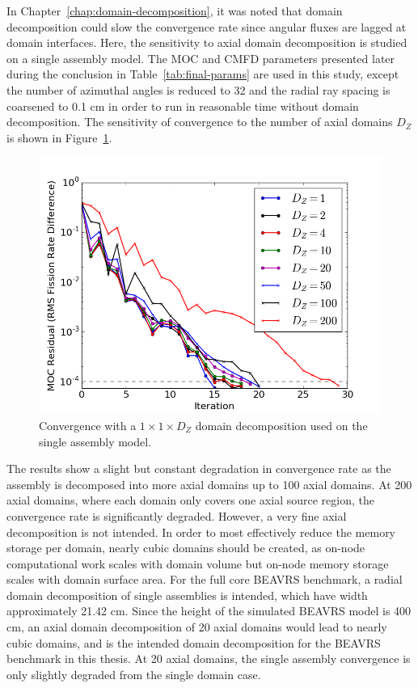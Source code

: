 In Chapter~\ref{chap:domain-decomposition}, it was noted that domain decomposition could slow the convergence rate since angular fluxes are lagged at domain interfaces. Here, the sensitivity to axial domain decomposition is studied on a single assembly model. The \ac{MOC} and \ac{CMFD} parameters presented later during the conclusion in Table~\ref{tab:final-params} are used in this study, except the number of azimuthal angles is reduced to 32 and the radial ray spacing is coarsened to 0.1 cm in order to run in reasonable time without domain decomposition. The sensitivity of convergence to the number of axial domains $D_Z$ is shown in Figure~\ref{fig:axial-dd}.

\begin{figure}[h!]
	\centering
	\includegraphics[width=0.9\linewidth]{figures/results/sensitivity/domains_z.png}
	\caption[]{Convergence with a $1 \times 1 \times D_Z$ domain decomposition used on the single assembly model.}
	\label{fig:axial-dd}
\end{figure}

The results show a slight but constant degradation in convergence rate as the assembly is decomposed into more axial domains up to 100 axial domains. At 200 axial domains, where each domain only covers one axial source region, the convergence rate is significantly degraded. However, a very fine axial decomposition is not intended. In order to most effectively reduce the memory storage per domain, nearly cubic domains should be created, as on-node computational work scales with domain volume but on-node memory storage scales with domain surface area. For the full core BEAVRS benchmark, a radial domain decomposition of single assemblies is intended, which have width approximately 21.42 cm. Since the height of the simulated BEAVRS model is 400 cm, an axial domain decomposition of 20 axial domains would lead to nearly cubic domains, and is the intended domain decomposition for the BEAVRS benchmark in this thesis. At 20 axial domains, the single assembly convergence is only slightly degraded from the single domain case. 


